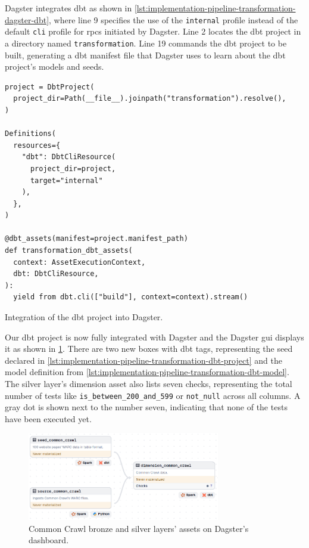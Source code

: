 Dagster integrates dbt as shown in \cref{lst:implementation-pipeline-transformation-dagster-dbt}, where line 9 specifies the use of the \texttt{internal} profile instead of the default \texttt{cli} profile for \acp{rpc} initiated by Dagster.
Line 2 locates the dbt project in a directory named \texttt{transformation}.
Line 19 commands the dbt project to be built, generating a dbt manifest file that Dagster uses to learn about the dbt project's models and seeds.

\begin{listing}[H]
\begin{verbatim}
project = DbtProject(
  project_dir=Path(__file__).joinpath("transformation").resolve(),
)

Definitions(
  resources={
    "dbt": DbtCliResource(
      project_dir=project,
      target="internal"
    ),
  },
)

@dbt_assets(manifest=project.manifest_path)
def transformation_dbt_assets(
  context: AssetExecutionContext,
  dbt: DbtCliResource,
):
  yield from dbt.cli(["build"], context=context).stream()
\end{verbatim}
\caption{Integration of the dbt project into Dagster.}
\label{lst:implementation-pipeline-transformation-dagster-dbt}
\end{listing}

Our dbt project is now fully integrated with Dagster and the Dagster \ac{gui} displays it as shown in \cref{fig:dagster-source-common-crawl}.
There are two new boxes with dbt tags, representing the seed declared in \cref{lst:implementation-pipeline-transformation-dbt-project} and the model definition from \cref{lst:implementation-pipeline-transformation-dbt-model}.
The silver layer's dimension asset also lists seven checks, representing the total number of tests like \texttt{is\_between\_200\_and\_599} or \texttt{not\_null} across all columns.
A gray dot is shown next to the number seven, indicating that none of the tests have been executed yet.

\begin{figure}[H]
  \centering
  \includegraphics[width=0.75\textwidth]{figures/dagster-common-crawl.png}
  \caption{Common Crawl bronze and silver layers' assets on Dagster's dashboard.}
  \label{fig:dagster-source-common-crawl}
\end{figure}

